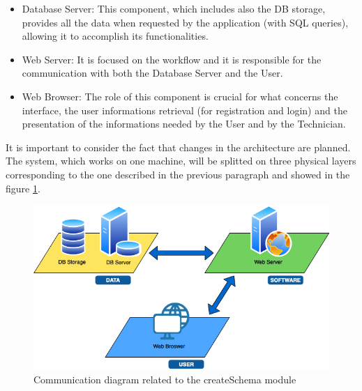 \documentclass{article}
\begin{document}
\begin{itemize}
    \item Database Server: This component, which includes also the DB storage, provides all the data when requested by the application (with SQL queries), allowing it to accomplish its functionalities.
    \item Web Server: It is focused on the workflow and it is responsible for the communication with both the Database Server and the User.
    \item Web Browser: The role of this component is crucial for what concerns the interface, the user informations retrieval (for registration and login) and the presentation of the informations needed by the User and by the Technician. 
\end{itemize}
It is important to consider the fact that changes in the architecture are planned. The system, which works on one machine, will be splitted on three physical layers corresponding to the one described in the previous paragraph and showed in the figure \ref{fig:com_createSchema}.\\
\begin{figure}[h]
    \centering
    \includegraphics[width=0.85\linewidth]{image/hardware_COMPLETE.png}
    \caption{Communication diagram related to the createSchema module}
    \label{fig:com_createSchema}
\end{figure}
\end{document}
